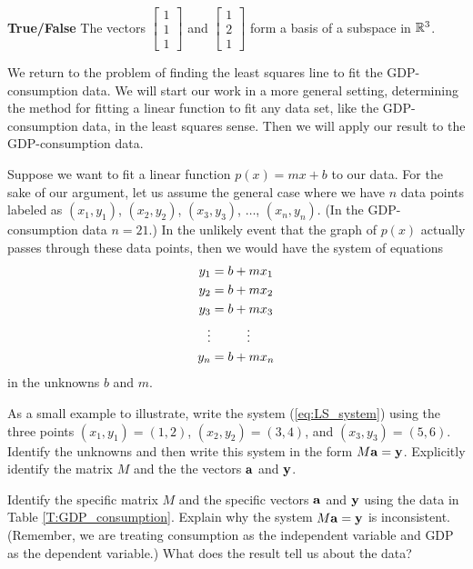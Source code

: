 \item \textbf{True/False} The vectors $\left[ \begin{array}{c} 1\\1\\1 \end{array} \right]$ and $\left[ \begin{array}{c} 1\\2\\1 \end{array} \right]$ form a basis of a subspace in $\mathbb{R}^3$.

\ea
\ee


We return to the problem of finding the least squares line to fit the GDP-consumption data. We will start our work in a more general setting, determining the  method for fitting a linear function to fit any data set, like the GDP-consumption data, in the least squares sense. Then we will apply our result to the GDP-consumption data. 

\begin{pactivity} \label{act:ls_no_line} Suppose we want to fit a linear function $p(x) = mx+b$ to our data. For the sake of our argument, let us assume the general case where we have $n$ data points labeled as $(x_1,y_1)$, $(x_2, y_2)$, $(x_3, y_3)$,  $\ldots$, $(x_n, y_n)$. (In the GDP-consumption data $n = 21$.) In the unlikely event that the graph of $p(x)$ actually passes through these data points, then we would have the system of equations
\begin{align}
y_1 &= b + mx_1  \notag  \\
y_2 &= b + mx_2 \notag  \\
y_3 &= b + mx_3 \label{eq:LS_system} \\
\vdots &\hspace{0.39in} \vdots  \notag\\
y_n &= b + mx_n \notag
\end{align}
in the unknowns $b$ and $m$. 
	\ba
	\item As a small example to illustrate, write the system (\ref{eq:LS_system}) using the three points $(x_1,y_1)= (1,2)$, $(x_2,y_2) = (3,4)$, and $(x_3,y_3) = (5,6)$. Identify the unknowns and then write this system in the form $M \mathbf{a} = \mathbf{y}$. Explicitly identify the matrix $M$ and the the vectors $\mathbf{a}$ and $\mathbf{y}$.
	
	\item Identify the specific matrix $M$ and the specific vectors $\mathbf{a}$ and $\mathbf{y}$ using the data in Table \ref{T:GDP_consumption}.  Explain why the system $M \mathbf{a} = \mathbf{y}$ is inconsistent. (Remember, we are treating consumption as the independent variable and GDP as the dependent variable.) What does the result tell us about the data? 

	
	\ea

\end{pactivity}



